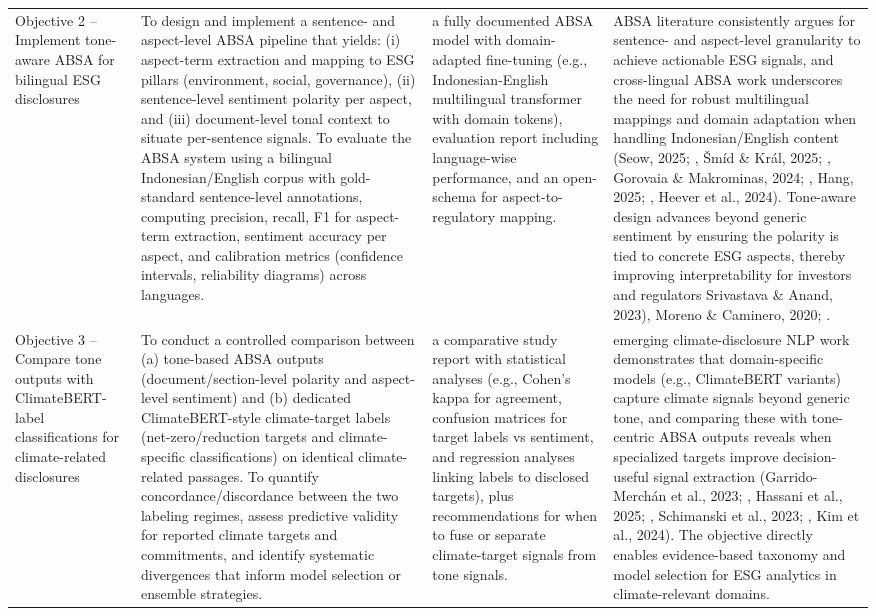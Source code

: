 \begin{landscape}
\begin{longtable}{p{3cm} p{8cm} p{4cm} p{8cm}}
Objective 2 – Implement tone-aware ABSA for bilingual ESG disclosures & To design and implement a sentence- and aspect-level ABSA pipeline that yields: (i) aspect-term extraction and mapping to ESG pillars (environment, social, governance), (ii) sentence-level sentiment polarity per aspect, and (iii) document-level tonal context to situate per-sentence signals. To evaluate the ABSA system using a bilingual Indonesian/English corpus with gold-standard sentence-level annotations, computing precision, recall, F1 for aspect-term extraction, sentiment accuracy per aspect, and calibration metrics (confidence intervals, reliability diagrams) across languages. & a fully documented ABSA model with domain-adapted fine-tuning (e.g., Indonesian-English multilingual transformer with domain tokens), evaluation report including language-wise performance, and an open-schema for aspect-to-regulatory mapping. & ABSA literature consistently argues for sentence- and aspect-level granularity to achieve actionable ESG signals, and cross-lingual ABSA work underscores the need for robust multilingual mappings and domain adaptation when handling Indonesian/English content (Seow, 2025; , Šmíd \& Král, 2025; , Gorovaia \& Makrominas, 2024; , Hang, 2025; , Heever et al., 2024). Tone-aware design advances beyond generic sentiment by ensuring the polarity is tied to concrete ESG aspects, thereby improving interpretability for investors and regulators Srivastava \& Anand, 2023), Moreno \& Caminero, 2020; . \\
\addlinespace
Objective 3 – Compare tone outputs with ClimateBERT-label classifications for climate-related disclosures & To conduct a controlled comparison between (a) tone-based ABSA outputs (document/section-level polarity and aspect-level sentiment) and (b) dedicated ClimateBERT-style climate-target labels (net-zero/reduction targets and climate-specific classifications) on identical climate-related passages. To quantify concordance/discordance between the two labeling regimes, assess predictive validity for reported climate targets and commitments, and identify systematic divergences that inform model selection or ensemble strategies. & a comparative study report with statistical analyses (e.g., Cohen’s kappa for agreement, confusion matrices for target labels vs sentiment, and regression analyses linking labels to disclosed targets), plus recommendations for when to fuse or separate climate-target signals from tone signals. & emerging climate-disclosure NLP work demonstrates that domain-specific models (e.g., ClimateBERT variants) capture climate signals beyond generic tone, and comparing these with tone-centric ABSA outputs reveals when specialized targets improve decision-useful signal extraction (Garrido-Merchán et al., 2023; , Hassani et al., 2025; , Schimanski et al., 2023; , Kim et al., 2024). The objective directly enables evidence-based taxonomy and model selection for ESG analytics in climate-relevant domains. \\

\end{longtable}
\end{landscape}
